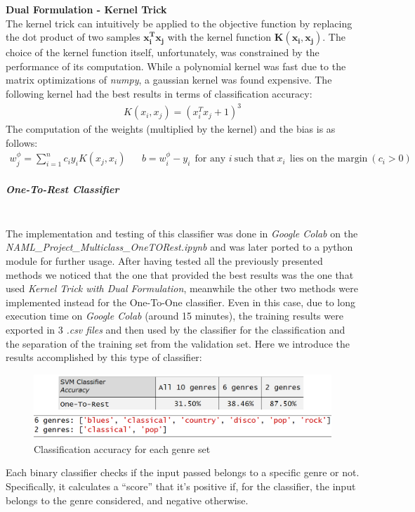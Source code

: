 \documentclass[12pt]{article}
\begin{document}
	\textbf{Dual Formulation - Kernel Trick}\\
	The kernel trick can intuitively be applied to the objective function by replacing the dot product of two samples $\mathbf{x_i^Tx_j}$ with the kernel function $\mathbf{K(x_i,x_j)}$. The choice of the kernel function itself, unfortunately, was constrained by the performance of its computation. While a polynomial kernel was fast due to the matrix optimizations of \textit{numpy}, a gaussian kernel was found expensive. The following kernel had the best results in terms of classification accuracy:
	\begin{align}
		K(x_i,x_j)=(x_i^Tx_j+1)^3
	\end{align}
	The computation of the weights (multiplied by the kernel) and the bias is as follows:
	\begin{align}
		w_j^\phi = \sum_{i=1}^n{c_iy_iK(x_j,x_i)}&&
		b = w^\phi_i-y_i \ \ \text{for any } i\ \text{such that}\ x_i\ \ \text{lies on the margin}\  (c_i>0)
	\end{align}
	\subparagraph{One-To-Rest Classifier}\mbox{}\\\newline
	The implementation and testing of this  classifier was done in \textit{Google Colab} on the \textit{NAML\_Project\_Multiclass\_OneTORest.ipynb} and was later ported to a python module for further usage. After having tested all the previously presented methods we noticed that the one that provided the best results was the
	one that used \textit{Kernel Trick with Dual Formulation}, meanwhile the other two methods were implemented instead for the One-To-One classifier.
	Even in this case, due to long execution
	time on \textit{Google Colab} (around 15 minutes), the training results were exported in 3 \textit{.csv files} and then used by the classifier for the
	classification and the separation of the training set from the validation set. Here we introduce the results accomplished by this type of classifier:
	\begin{figure}[H]
		\hspace{70pt}\includegraphics[scale=0.5]{svm_otr_acc}
		\caption{Classification accuracy for each genre set}
	\end{figure}
	Each binary classifier checks if the input passed belongs to a specific genre or not. Specifically, it calculates a “score” that it’s positive if, for the classifier, the input belongs to the genre considered, and negative otherwise.
	
\end{document}
